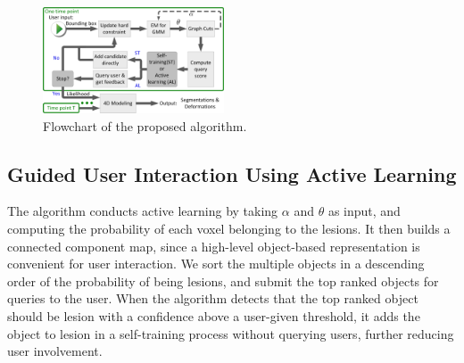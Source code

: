 \documentclass{article}
\begin{document}
\begin{figure} [t]
\centering
\includegraphics[width=0.479\textwidth]{./figures/acLearn_flowchart}
\caption{Flowchart of the proposed algorithm.}
\label{fig:flowchart}
\end{figure}
\subsection{Guided User Interaction Using Active Learning}


The algorithm conducts active learning by taking $\alpha$ and $\theta$ as
input, and computing the probability of each voxel belonging to the lesions. It
then builds a connected component map, since a high-level object-based
representation is convenient for user interaction. We sort the multiple objects
in a descending order of the probability of being lesions, and submit the
top ranked objects for queries to the user.
When the algorithm detects that the top ranked object should
be lesion with a confidence above a user-given threshold, it adds the object
to lesion in a self-training process without querying users, further
reducing user involvement.
\end{document}
